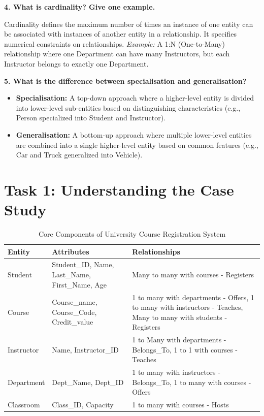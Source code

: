 \documentclass[12pt,a4paper]{article}
\begin{document}
\vspace{0.5cm}

\textbf{4. What is cardinality? Give one example.}

Cardinality defines the maximum number of times an instance of one entity can be associated with instances of another entity in a relationship. It specifies numerical constraints on relationships.
\newline\textit{Example:} A 1:N (One-to-Many) relationship where one Department can have many Instructors, but each Instructor belongs to exactly one Department.

\vspace{0.5cm}

\textbf{5. What is the difference between specialisation and generalisation?}

\begin{itemize}
    \item \textbf{Specialisation:} A top-down approach where a higher-level entity is divided into lower-level sub-entities based on distinguishing characteristics (e.g., Person specialized into Student and Instructor).
    \item \textbf{Generalisation:} A bottom-up approach where multiple lower-level entities are combined into a single higher-level entity based on common features (e.g., Car and Truck generalized into Vehicle).
\end{itemize}

\section*{Task 1: Understanding the Case Study}


\begin{table}[H]
    \centering
    \renewcommand{\arraystretch}{1.5}
    \begin{tabular}{|l|p{4cm}|p{6cm}|}
        \hline
        \textbf{Entity} & \textbf{Attributes} & \textbf{Relationships} \\ \hline
        Student & Student\_ID, Name, Last\_Name, First\_Name, Age & Many to many with courses - Registers \\ \hline
        Course & Course\_name, Course\_Code, Credit\_value & 1 to many with departments - Offers, 1 to many with instructors - Teaches, Many to many with students - Registers \\ \hline
        Instructor & Name, Instructor\_ID & 1 to Many with departments - Belongs\_To, 1 to 1 with courses - Teaches \\ \hline
        Department & Dept\_Name, Dept\_ID & 1 to many with instructors - Belongs\_To, 1 to many with courses - Offers \\ \hline
        Classroom & Class\_ID, Capacity & 1 to many with courses - Hosts \\ \hline
    \end{tabular}
    \caption{Core Components of University Course Registration System}
\end{table}
\end{document}
